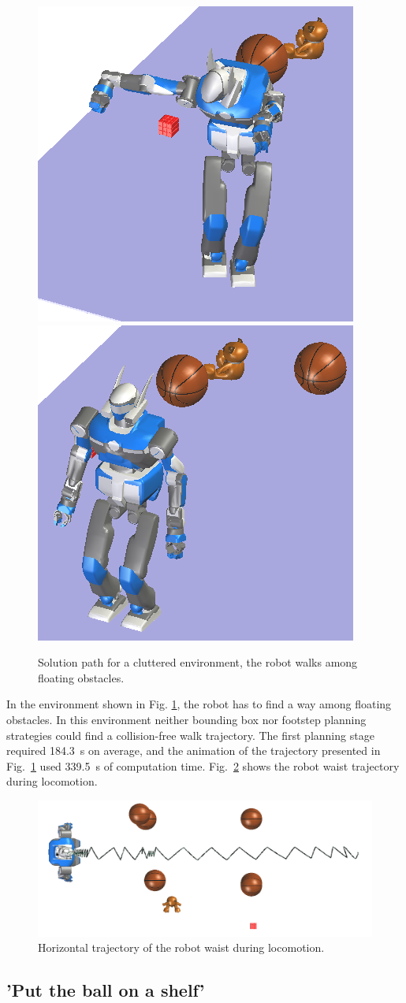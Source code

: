 \documentclass{article}
\begin{document}
\begin{figure}[h!]
\includegraphics[width=0.24\linewidth]{pics/objects-cloud/perspective-7.png}
\includegraphics[width=0.24\linewidth]{pics/objects-cloud/perspective-8.png}

\caption{Solution path for a cluttered environment, the robot walks
  among floating obstacles.}
\label{fig:cluttered}
\end{figure}

In the environment shown in Fig. \ref{fig:cluttered}, the robot
has to find a way among floating obstacles. In this
environment neither bounding box nor footstep planning strategies
could find a collision-free walk trajectory.
The first planning stage required
184.3~s on average, and the animation of the trajectory presented in 
Fig.~\ref{fig:cluttered} used 339.5~s of computation time. Fig.~\ref{fig:cluttered-waist} 
shows the robot waist trajectory during locomotion.

\begin{figure}[h!]
  \centering
  \includegraphics[width=0.7\linewidth]{pics/objects-cloud/waist-trajectory.png}

  \caption{Horizontal trajectory of the robot waist during
    locomotion.}
  \label{fig:cluttered-waist} 
\end{figure}


\subsection{'Put the ball on a shelf'}
\end{document}
